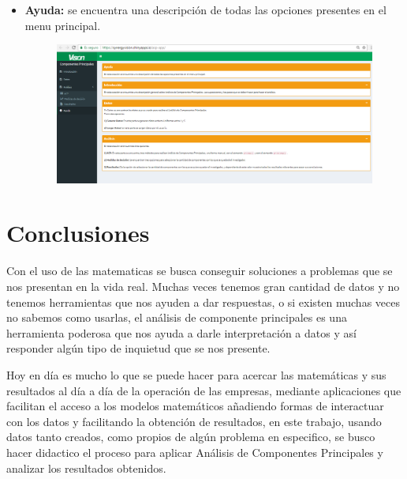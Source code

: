 \documentclass[12pt,letterpaper]{report} %
\begin{document}
\begin{itemize}
\newpage

\item \textbf{Ayuda:} se encuentra una descripción de todas las opciones presentes en el menu principal.

\begin{figure}[H]
\begin{center}
\includegraphics[width=15 cm,height=10 cm]{img/Ayuda.png}
\end{center}
\end{figure}

\end{itemize}

\chapter*{Conclusiones}

Con el uso de las matematicas se busca conseguir soluciones a problemas que se nos presentan en la vida real. Muchas veces tenemos gran cantidad de datos y no tenemos herramientas que nos ayuden a dar respuestas, o si existen muchas veces no sabemos como usarlas, el análisis de componente principales es una herramienta poderosa que nos ayuda a darle interpretación a datos y así responder algún tipo de inquietud que se nos presente. 

Hoy en día es mucho lo que se puede hacer para acercar las matemáticas y sus resultados al día a día de la operación de las empresas, mediante aplicaciones que facilitan el acceso a los modelos matemáticos añadiendo formas de interactuar con los datos y facilitando la obtención de resultados, en este trabajo, usando datos tanto creados, como propios de algún problema en especifico, se busco hacer didactico el proceso para aplicar Análisis de Componentes Principales y analizar los resultados obtenidos.
\end{document}
